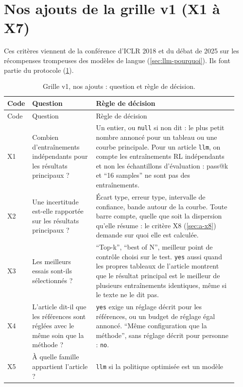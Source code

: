 \section{Nos ajouts de la grille v1 (X1 à X7)}
\label{sec:a-x}

Ces critères viennent de la conférence d'ICLR 2018 et du débat de 2025 sur les récompenses trompeuses des
modèles de langue (\cref{sec:llm-pourquoi}). Ils font partie du protocole
(\cref{tab:a-grille-x}).

\begin{small}
\begin{longtable}{@{}p{0.07\linewidth}>{\raggedright\arraybackslash}p{0.27\linewidth}>{\raggedright\arraybackslash}p{0.6\linewidth}@{}}
\caption{Grille v1, nos ajouts : question et règle de décision.}\label{tab:a-grille-x}\\
\toprule
Code & Question & Règle de décision \\
\midrule
\endfirsthead
\toprule
Code & Question & Règle de décision \\
\midrule
\endhead
\bottomrule
\endfoot
X1 & Combien d'entraînements indépendants pour les résultats principaux ? & Un entier, ou
  \texttt{null} si non dit : le plus petit nombre annoncé pour un tableau ou une courbe principale.
  Pour un article \texttt{llm}, on compte les entraînements RL indépendants et non les échantillons
  d'évaluation : pass@k et \enquote{16 samples} ne sont pas des entraînements. \\
X2 & Une incertitude est-elle rapportée sur les résultats principaux ? & Écart type, erreur type,
  intervalle de confiance, bande autour de la courbe. Toute barre compte, quelle que soit la
  dispersion qu'elle résume : le critère X8 (\cref{sec:a-x8}) demande sur quoi elle est calculée. \\
X3 & Les meilleurs essais sont-ils sélectionnés ? & \enquote{Top-k}, \enquote{best of N}, meilleur
  point de contrôle choisi sur le test. \texttt{yes} aussi quand les propres tableaux de l'article
  montrent que le résultat principal est le meilleur de plusieurs entraînements identiques, même si
  le texte ne le dit pas. \\
X4 & L'article dit-il que les références sont réglées avec le même soin que la méthode ? & \texttt{yes} exige un
  réglage décrit pour les références, ou un budget de réglage égal annoncé. \enquote{Même
  configuration que la méthode}, sans réglage décrit pour personne : \texttt{no}. \\
X5 & À quelle famille appartient l'article ? & \texttt{llm} si la politique optimisée est un modèle

\end{longtable}
\end{small}
